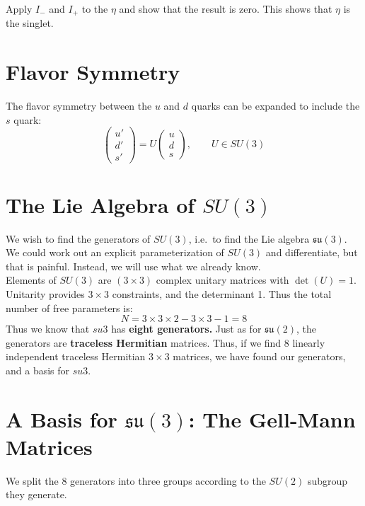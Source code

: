 \documentclass[12pt]{article}
\begin{document}
\exercise  Apply $I_-$ and $I_+$ to the $\eta$ and show that the result is zero.  This shows that $\eta$ is the singlet.\\[5pt]

\section{Flavor Symmetry}

The flavor symmetry between the $u$ and $d$ quarks can be expanded to include
the $s$ quark:
\begin{equation*}
  \begin{pmatrix} u' \\ d' \\ s' \end{pmatrix}
  = U
  \begin{pmatrix} u \\ d \\ s \end{pmatrix},
  \qquad U \in SU(3)
\end{equation*}

\section*{The Lie Algebra of $SU(3)$}

We wish to find the generators of $SU(3)$, i.e.\ to find the Lie
algebra $\mathfrak{su}(3)$. We could work out an explicit
parameterization of $SU(3)$ and differentiate, but that is painful.
Instead, we will use what we already know.\\[6pt]


Elements of $SU(3)$ are $(3\times 3)$
complex unitary matrices with $\det(U)=1$.  Unitarity provides $3\times 3$ constraints, and the determinant 1.  Thus the total number of free parameters is:
$$N = 3\times 3\times 2 - 3\times 3 - 1 = 8$$
Thus we know that $su{3}$ has {\bf eight generators.}
Just as for $\mathfrak{su}(2)$, the generators are
\textbf{traceless Hermitian} matrices.  Thus, if we find 8 linearly
independent traceless Hermitian $3 \times 3$ matrices, we have found
our generators, and a basis for $su{3}$.

\section*{A Basis for $\mathfrak{su}(3)$: The Gell-Mann Matrices}

We split the 8 generators into three groups according to the $SU(2)$
subgroup they generate.\\[6pt]
\end{document}
